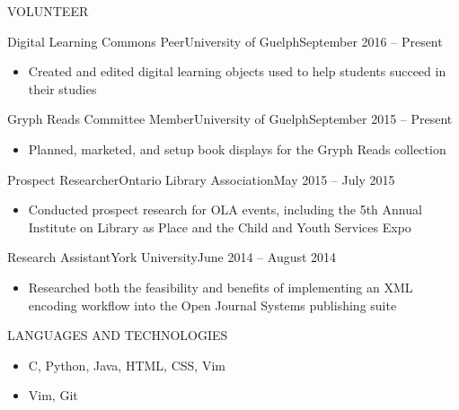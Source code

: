 \documentclass[]{mcdowellcv}
\begin{document}
	\begin{cvsection}{VOLUNTEER}
        \begin{cvsubsection}{Digital Learning Commons Peer}{University of Guelph}{September 2016 -- Present}
			\begin{itemize}
				\item Created and edited digital learning objects used to help students succeed in their studies
			\end{itemize}
		\end{cvsubsection}
        \begin{cvsubsection}{Gryph Reads Committee Member}{University of Guelph}{September 2015 -- Present}
			\begin{itemize}
				\item Planned, marketed, and setup book displays for the Gryph Reads collection
			\end{itemize}
		\end{cvsubsection}
        \begin{cvsubsection}{Prospect Researcher}{Ontario Library Association}{May 2015 -- July 2015}
			\begin{itemize}
				\item Conducted prospect research for OLA events, including the 5th Annual Institute on Library as Place and the Child and Youth Services Expo
			\end{itemize}
		\end{cvsubsection}
        \begin{cvsubsection}{Research Assistant}{York University}{June 2014 -- August 2014}
			\begin{itemize}
				\item Researched both the feasibility and benefits of implementing an XML encoding workflow into the Open Journal Systems publishing suite
			\end{itemize}
		\end{cvsubsection}
	\end{cvsection}
	
	\begin{cvsection}{LANGUAGES AND TECHNOLOGIES}
		\begin{cvsubsection}{}{}{}	
			\begin{itemize}
				\item C, Python, Java, HTML, CSS, Vim
				\item Vim, Git
			\end{itemize}
		\end{cvsubsection}
	\end{cvsection}
	
\end{document}
